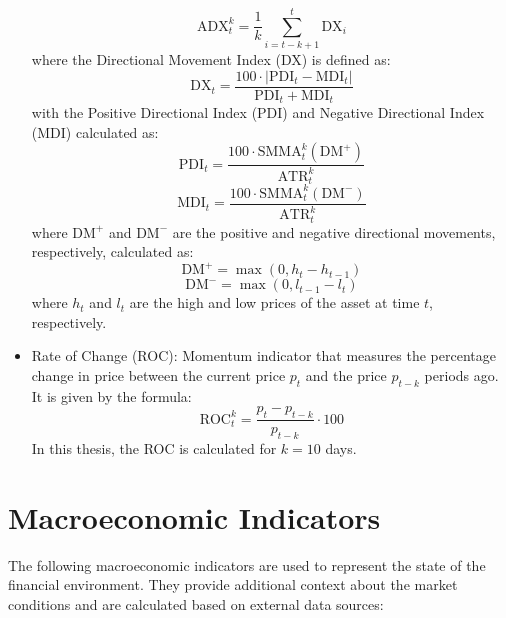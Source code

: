 \begin{itemize}
    \begin{equation}
        \text{ADX}_t^k = \frac{1}{k} \sum_{i=t-k+1}^{t} \text{DX}_i
    \end{equation}
    where the Directional Movement Index (DX) is defined as:
    \begin{equation}
        \text{DX}_t = \frac{100 \cdot \left| \text{PDI}_t - \text{MDI}_t \right|}{\text{PDI}_t + \text{MDI}_t}
    \end{equation}
    with the Positive Directional Index (PDI) and Negative Directional Index (MDI) calculated as:
    \begin{equation}
        \text{PDI}_t = \frac{100 \cdot \text{SMMA}_t^k ( \text{DM}^+ )}{\text{ATR}_t^k}
    \end{equation}
    \begin{equation}
        \text{MDI}_t = \frac{100 \cdot \text{SMMA}_t^k ( \text{DM}^- )}{\text{ATR}_t^k}
    \end{equation}
    where $\text{DM}^+$ and $\text{DM}^-$ are the positive and negative directional movements, respectively, calculated as:
    \begin{equation}
        \text{DM}^+ = \max \left( 0, h_t - h_{t-1} \right)
    \end{equation}
    \begin{equation}
        \text{DM}^- = \max \left( 0, l_{t-1} - l_t \right)
    \end{equation}
    where $h_t$ and $l_t$ are the high and low prices of the asset at time $t$, respectively. 
    \item Rate of Change (ROC): Momentum indicator that measures the percentage change in price between the current price $p_t$ and the price $p_{t-k}$ periods ago. It is given by the formula:
    \begin{equation}
        \text{ROC}_t^k = \frac{p_t - p_{t-k}}{p_{t-k}} \cdot 100
    \end{equation}
    In this thesis, the ROC is calculated for $k=10$ days.
\end{itemize}

\section{Macroeconomic Indicators} \label{sec:macroeconomic-indicators}

The following macroeconomic indicators are used to represent the state of the financial environment. They provide additional context about the market conditions and are calculated based on external data sources: